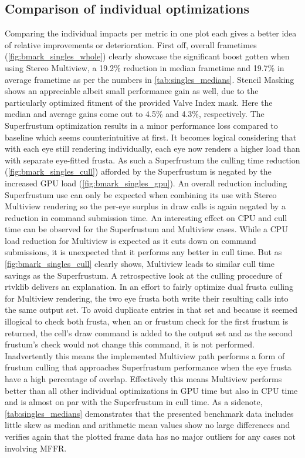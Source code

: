 \subsection{Comparison of individual optimizations} \label{singles_comp}
Comparing the individual impacts per metric in one plot each gives a better idea of relative improvements or deterioration. 
First off, overall frametimes (\autoref{fig:bmark_singles_whole}) clearly showcase the significant boost gotten when using Stereo Multiview, a 19.2\% reduction in median frametime and 19.7\% in average frametime as per the numbers in \autoref{tab:singles_medians}. Stencil Masking shows an appreciable albeit small performance gain as well, due to the particularly optimized fitment of the provided Valve Index mask. Here the median and average gains come out to 4.5\% and 4.3\%, respectively. The Superfrustum optimization results in a minor performance loss compared to baseline which seems counterintuitive at first. It becomes logical considering that with each eye still rendering individually, each eye now renders a higher load than with separate eye-fitted frusta. As such a Superfrustum the culling time reduction (\autoref{fig:bmark_singles_cull}) afforded by the Superfrustum is negated by the increased GPU load (\autoref{fig:bmark_singles_gpu}). An overall reduction including Superfrustum use can only be expected when combining its use with Stereo Multiview rendering so the per-eye surplus in draw calls is again negated by a reduction in command submission time. 
An interesting effect on CPU and cull time can be observed for the Superfrustum and Multiview cases. While a CPU load reduction for Multiview is expected as it cuts down on command submissions, it is unexpected that it performs any better in cull time. But as \autoref{fig:bmark_singles_cull} clearly shows, Multiview leads to similar cull time savings as the Superfrustum. A retrospective look at the culling procedure of \gls{rtvklib} delivers an explanation. In an effort to fairly optimize dual frusta culling for Multiview rendering, the two eye frusta both write their resulting calls into the same output set. To avoid duplicate entries in that set and because it seemed illogical to check both frusta, when an  or  frustum check for the first frustum is returned, the cell's draw command is added to the output set and as the second frustum's check would not change this command, it is not performed. Inadvertently this means the implemented Multiview path performs a form of frustum culling that approaches Superfrustum performance when the eye frusta have a high percentage of overlap. Effectively this means Multiview performs better than all other individual optimizations in GPU time but also in CPU time and is almost on par with the Superfrustum in cull time. As a sidenote, \autoref{tab:singles_medians} demonstrates that the presented benchmark data includes little skew as median and arithmetic mean values show no large differences and verifies again that the plotted frame data has no major outliers for any cases not involving MFFR. 

